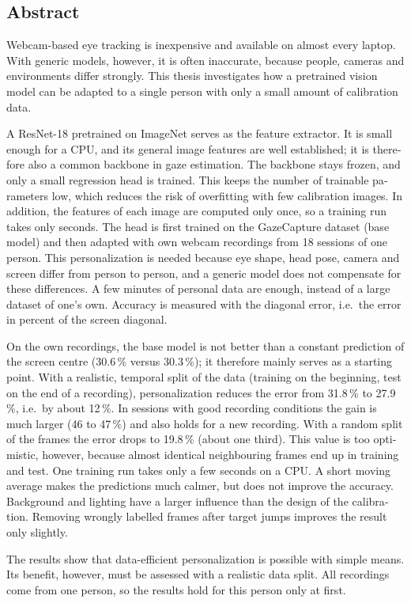 \ifZweiteSprache
\begin{otherlanguage}{english}
\chapter*{Abstract}
Webcam-based eye tracking is inexpensive and available on almost every laptop.
With generic models, however, it is often inaccurate, because people, cameras
and environments differ strongly. This thesis investigates how a pretrained
vision model can be adapted to a single person with only a small amount of
calibration data.

A ResNet-18 pretrained on ImageNet serves as the feature extractor. It is small
enough for a CPU, and its general image features are well established; it is
therefore also a common backbone in gaze estimation. The backbone stays frozen,
and only a small regression head is trained. This keeps the number of trainable
parameters low, which reduces the risk of overfitting with few calibration
images. In addition, the features of each image are computed only once, so a
training run takes only seconds. The head is first trained on the GazeCapture
dataset (base model) and then adapted with own webcam recordings from 18
sessions of one person. This personalization is needed because eye shape, head
pose, camera and screen differ from person to person, and a generic model does
not compensate for these differences. A few minutes of personal data are
enough, instead of a large dataset of one's own. Accuracy is measured with the
diagonal error, i.e.\ the error in percent of the screen diagonal.

On the own recordings, the base model is not better than a constant prediction
of the screen centre (30.6\,\% versus 30.3\,\%); it therefore mainly serves as
a starting point. With a realistic, temporal split of the data (training on the
beginning, test on the end of a recording), personalization reduces the error
from 31.8\,\% to 27.9\,\%, i.e.\ by about 12\,\%. In sessions with good
recording conditions the gain is much larger (46 to 47\,\%) and also holds for
a new recording. With a random split of the frames the error drops to
19.8\,\% (about one third). This value is too optimistic, however, because
almost identical neighbouring frames end up in training and test. One training
run takes only a few seconds on a CPU. A short moving average makes the
predictions much calmer, but does not improve the accuracy. Background and
lighting have a larger influence than the design of the calibration. Removing wrongly labelled frames after target jumps
improves the result only slightly.

The results show that data-efficient personalization is possible with simple
means. Its benefit, however, must be assessed with a realistic data split. All
recordings come from one person, so the results hold for this person only at
first.

\end{otherlanguage}
\fi

